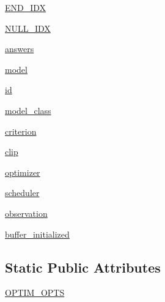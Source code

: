 \begin{DoxyCompactItemize}
\item 
\hyperlink{classparlai_1_1agents_1_1legacy__agents_1_1seq2seq_1_1seq2seq__v0_1_1Seq2seqAgent_a46ebee256e0812f6cab77a71c02578e0}{E\+N\+D\+\_\+\+I\+DX}
\item 
\hyperlink{classparlai_1_1agents_1_1legacy__agents_1_1seq2seq_1_1seq2seq__v0_1_1Seq2seqAgent_a8589f9403a5d358b1c58b467fc556680}{N\+U\+L\+L\+\_\+\+I\+DX}
\item 
\hyperlink{classparlai_1_1agents_1_1legacy__agents_1_1seq2seq_1_1seq2seq__v0_1_1Seq2seqAgent_ad5d4bdcd877577596273c4af1eb4c70d}{answers}
\item 
\hyperlink{classparlai_1_1agents_1_1legacy__agents_1_1seq2seq_1_1seq2seq__v0_1_1Seq2seqAgent_ae6ef958bb58cc1597b23b0a6c6c49b3f}{model}
\item 
\hyperlink{classparlai_1_1agents_1_1legacy__agents_1_1seq2seq_1_1seq2seq__v0_1_1Seq2seqAgent_a616955265cd96254aae5b5958ac18159}{id}
\item 
\hyperlink{classparlai_1_1agents_1_1legacy__agents_1_1seq2seq_1_1seq2seq__v0_1_1Seq2seqAgent_a203f77c92dd9f343cd7c5580756d5e5a}{model\+\_\+class}
\item 
\hyperlink{classparlai_1_1agents_1_1legacy__agents_1_1seq2seq_1_1seq2seq__v0_1_1Seq2seqAgent_ad336994a64a83591ba1388aef3f1d5de}{criterion}
\item 
\hyperlink{classparlai_1_1agents_1_1legacy__agents_1_1seq2seq_1_1seq2seq__v0_1_1Seq2seqAgent_a4896d5dc3fd7a0f876a654f0bc942b6a}{clip}
\item 
\hyperlink{classparlai_1_1agents_1_1legacy__agents_1_1seq2seq_1_1seq2seq__v0_1_1Seq2seqAgent_ac6a5cc3b1faaae160f5c10318a7afcfd}{optimizer}
\item 
\hyperlink{classparlai_1_1agents_1_1legacy__agents_1_1seq2seq_1_1seq2seq__v0_1_1Seq2seqAgent_ac8229fafe6c4b7d7ebedbd0f00b55eb0}{scheduler}
\item 
\hyperlink{classparlai_1_1agents_1_1legacy__agents_1_1seq2seq_1_1seq2seq__v0_1_1Seq2seqAgent_a4473b0e478d7928c2b59ab653c8334fb}{observation}
\item 
\hyperlink{classparlai_1_1agents_1_1legacy__agents_1_1seq2seq_1_1seq2seq__v0_1_1Seq2seqAgent_a31e1353ee2c64ac03af2bc7854597f35}{buffer\+\_\+initialized}
\end{DoxyCompactItemize}
\subsection*{Static Public Attributes}
\begin{DoxyCompactItemize}
\item 
\hyperlink{classparlai_1_1agents_1_1legacy__agents_1_1seq2seq_1_1seq2seq__v0_1_1Seq2seqAgent_a82630ee9be1d6e9828ffdd24049a8de3}{O\+P\+T\+I\+M\+\_\+\+O\+P\+TS}
\end{DoxyCompactItemize}



